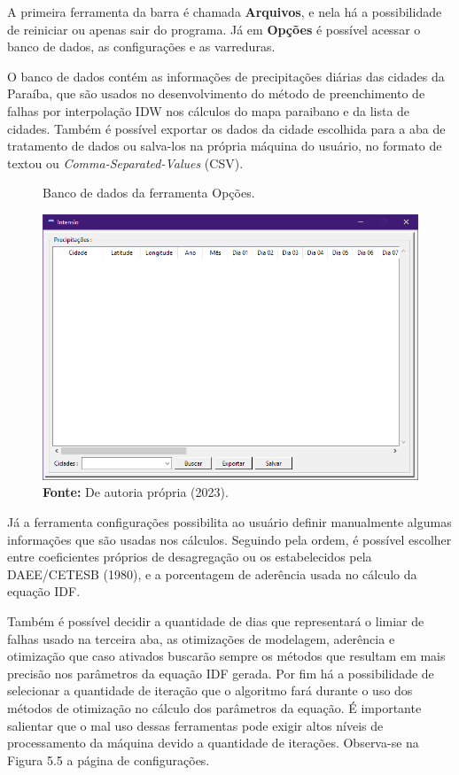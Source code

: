 A primeira ferramenta da barra é chamada \textbf{Arquivos}, e nela há a possibilidade de reiniciar ou apenas sair do programa. Já em \textbf{Opções} é possível acessar o banco de dados, as configurações e as varreduras.

O banco de dados contém as informações de precipitações diárias das cidades da Paraíba, que são usados no desenvolvimento do método de preenchimento de falhas por interpolação IDW nos cálculos do mapa paraibano e da lista de cidades. Também é possível exportar os dados da cidade escolhida para a aba de tratamento de dados ou salva-los na própria máquina do usuário, no formato de textou ou \textit{Comma-Separated-Values} (CSV).\bigskip

\begin{figure}[!ht]
	\centering
	\caption{Banco de dados da ferramenta Opções.}
	\includegraphics[width=.7625\linewidth]{figuras/banco_de_dados.png}
	\caption*{\textbf{Fonte:} De autoria própria (2023).}
	\label{fig:banco_de_dados.png}
\end{figure}

Já a ferramenta configurações possibilita ao usuário definir manualmente algumas informações que são usadas nos cálculos. Seguindo pela ordem, é possível escolher entre coeficientes próprios de desagregação ou os estabelecidos pela DAEE/CETESB (1980), e a porcentagem de aderência usada no cálculo da equação IDF.

Também é possível decidir a quantidade de dias que representará o limiar de falhas usado na terceira aba, as otimizações de modelagem, aderência e otimização que caso ativados buscarão sempre os métodos que resultam em mais precisão nos parâmetros da equação IDF gerada. Por fim há a possibilidade de selecionar a quantidade de iteração que o algoritmo fará durante o uso dos métodos de otimização no cálculo dos parâmetros da equação. É importante salientar que o mal uso dessas ferramentas pode exigir altos níveis de processamento da máquina devido a quantidade de iterações. Observa-se na Figura 5.5 a página de configurações.


